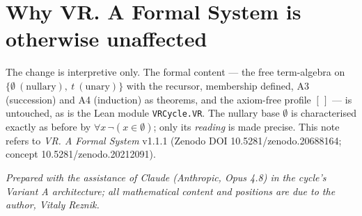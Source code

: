 \documentclass[11pt]{article}
\begin{document}
\section*{Why VR. A Formal System is otherwise unaffected}

The change is interpretive only. The formal content --- the free term-algebra on
$\{\emptyset\ (\text{nullary}),\ t\ (\text{unary})\}$ with the recursor, membership defined, A3
(succession) and A4 (induction) as theorems, and the axiom-free profile $[\,]$ --- is untouched, as is
the Lean module \texttt{VRCycle.VR}. The nullary base $\emptyset$ is characterised exactly as before by
$\forall x\,\neg(x \in \emptyset)$; only its \emph{reading} is made precise.
This note refers to \emph{VR. A Formal System} v1.1.1 (Zenodo DOI 10.5281/zenodo.20688164; concept
10.5281/zenodo.20212091).

\vfill
\noindent\emph{Prepared with the assistance of Claude (Anthropic, Opus 4.8) in the cycle's Variant A
architecture; all mathematical content and positions are due to the author, Vitaly Reznik.}
\end{document}
